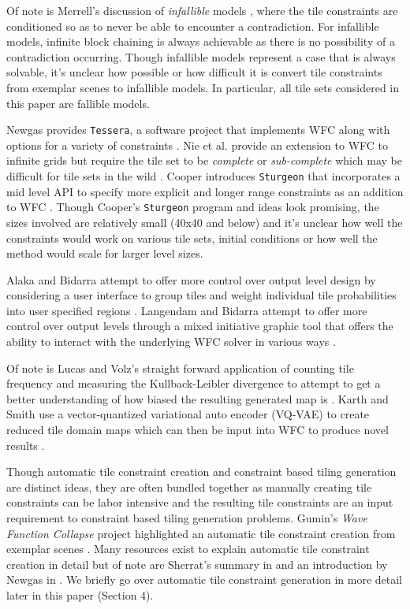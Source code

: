 Of note is Merrell's discussion of \textit{infallible} models \cite{Merrell_2009}, where the tile constraints are
conditioned so as to never be able to encounter a contradiction.
For infallible models, infinite block chaining is always achievable as there is no possibility of a contradiction occurring.
Though infallible models represent a case that is always solvable,
it's unclear how possible or how difficult it is convert tile constraints from exemplar scenes to infallible models.
In particular, all tile sets considered in this paper are fallible models.

Newgas provides \texttt{Tessera}, a software project that implements WFC along with options for a variety of constraints \cite{Newgas_2021}.
Nie et al. provide an extension to WFC to infinite grids but require the tile set to be \textit{complete} or \textit{sub-complete}
which may be difficult for tile sets in the wild \cite{Nie_etall_2023}.
Cooper introduces \texttt{Sturgeon} that incorporates a mid level API to specify more explicit and longer range constraints as an addition
to WFC \cite{Cooper_2022}.
Though Cooper's \texttt{Sturgeon} program and ideas look promising, the sizes involved are relatively small (40x40 and below)
and it's unclear how well the constraints would work on various tile sets, initial conditions or how well the method would scale
for larger level sizes.

Alaka and Bidarra attempt to offer more control over output level design by considering a user interface to group tiles and
weight individual tile probabilities into user specified regions \cite{Alaka_Bidarra_Rafael_2023}.
Langendam and Bidarra attempt to offer more control over output levels through a mixed initiative graphic tool that offers
the ability to interact with the underlying WFC solver in various ways \cite{Langendam_etall_2022}.

Of note is Lucas and Volz's straight forward application of counting tile frequency and measuring the Kullback-Leibler divergence
to attempt to get a better understanding of how biased the resulting generated map is \cite{Lucas_Volz_2019}.
Karth and Smith use a vector-quantized variational auto encoder (VQ-VAE) to create reduced tile domain maps which can then
be input into WFC to produce novel results \cite{Karth_Smith_2017}.


Though automatic tile constraint creation and constraint based tiling generation are distinct ideas, they are often
bundled together as manually creating tile constraints can be labor intensive and the resulting tile constraints
are an input requirement to constraint based tiling generation problems.
Gumin's \textit{Wave Function Collapse} project highlighted an automatic tile constraint creation from exemplar
scenes \cite{Gumin_2016}.
Many resources exist to explain automatic tile constraint creation in detail but of note are Sherrat's summary in
\cite{Sherratt_2019} and an introduction by Newgas in \cite{BorisTheBrave_wfc_2021}.
We briefly go over automatic tile constraint generation in more detail later in this paper (Section 4).

